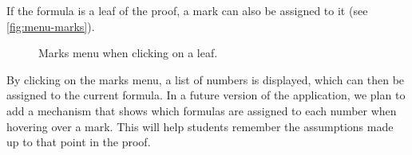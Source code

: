 If the formula is a leaf of the proof, a mark can also be assigned to it (see \autoref{fig:menu-marks}).

\begin{figure}[h]
    \centering
    \caption{Marks menu when clicking on a leaf.}
    \label{fig:menu-marks}
\end{figure}


By clicking on the marks menu, a list of numbers is displayed, which can then be assigned to the current formula. In a future version of the application, we plan to add a mechanism that shows which formulas are assigned to each number when hovering over a mark. This will help students remember the assumptions made up to that point in the proof.

